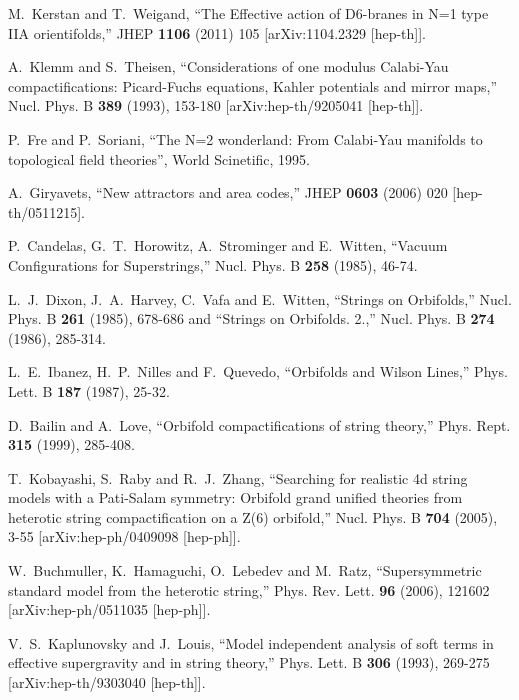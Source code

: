 \documentclass[12pt]{article}
\numberwithin{equation}{section}
\begin{document}
\begin{thebibliography}{999}
  M.~Kerstan and T.~Weigand,
  ``The Effective action of D6-branes in N=1 type IIA orientifolds,''
  JHEP {\bf 1106} (2011) 105 [arXiv:1104.2329 [hep-th]].

A.~Klemm and S.~Theisen,
``Considerations of one modulus Calabi-Yau compactifications: Picard-Fuchs equations, Kahler potentials and mirror maps,''
Nucl. Phys. B \textbf{389} (1993), 153-180
[arXiv:hep-th/9205041 [hep-th]].

P.~Fre and P.~Soriani, ``The N=2 wonderland: From Calabi-Yau manifolds to topological field theories'', World Scinetific, 1995.

  A.~Giryavets, ``New attractors and area codes,''
  JHEP {\bf 0603} (2006) 020 [hep-th/0511215].
  
P.~Candelas, G.~T.~Horowitz, A.~Strominger and E.~Witten, ``Vacuum Configurations for Superstrings,''
Nucl. Phys. B \textbf{258} (1985), 46-74.

L.~J.~Dixon, J.~A.~Harvey, C.~Vafa and E.~Witten,
``Strings on Orbifolds,''
Nucl. Phys. B \textbf{261} (1985), 678-686
and ``Strings on Orbifolds. 2.,''
Nucl. Phys. B \textbf{274} (1986), 285-314.

L.~E.~Ibanez, H.~P.~Nilles and F.~Quevedo,
``Orbifolds and Wilson Lines,''
Phys. Lett. B \textbf{187} (1987), 25-32.

D.~Bailin and A.~Love,
``Orbifold compactifications of string theory,''
Phys. Rept. \textbf{315} (1999), 285-408.

T.~Kobayashi, S.~Raby and R.~J.~Zhang,
``Searching for realistic 4d string models with a Pati-Salam symmetry: Orbifold grand unified theories from heterotic string compactification on a Z(6) orbifold,''
Nucl. Phys. B \textbf{704} (2005), 3-55
[arXiv:hep-ph/0409098 [hep-ph]].

W.~Buchmuller, K.~Hamaguchi, O.~Lebedev and M.~Ratz,
``Supersymmetric standard model from the heterotic string,''
Phys. Rev. Lett. \textbf{96} (2006), 121602
[arXiv:hep-ph/0511035 [hep-ph]].

V.~S.~Kaplunovsky and J.~Louis,
``Model independent analysis of soft terms in effective supergravity and in string theory,''
Phys. Lett. B \textbf{306} (1993), 269-275
[arXiv:hep-th/9303040 [hep-th]].


\end{thebibliography}
\end{document}

